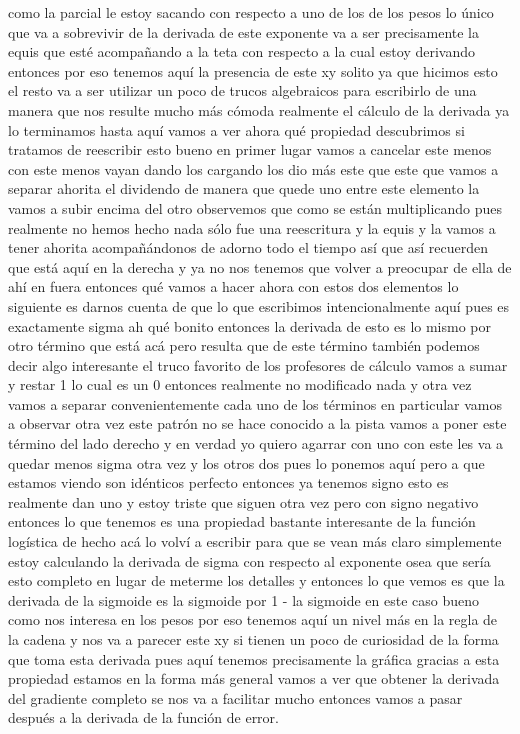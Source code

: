 como la parcial le estoy sacando con respecto a uno de los de los pesos lo único que va a sobrevivir de la derivada de este exponente va a ser precisamente la equis que esté acompañando a la teta con respecto a la cual estoy derivando entonces por eso tenemos aquí la presencia de este xy solito ya que hicimos esto el resto va a ser utilizar un poco de trucos algebraicos para escribirlo de una manera que nos resulte mucho más cómoda realmente el cálculo de la derivada ya lo terminamos hasta aquí vamos a ver ahora qué propiedad descubrimos si tratamos de reescribir esto bueno en primer lugar vamos a cancelar este menos con este menos vayan dando los cargando los dio más este que este que vamos a separar ahorita el dividendo de manera que quede uno entre este elemento la vamos a subir encima del otro observemos que como se están multiplicando pues realmente no hemos hecho nada sólo fue una reescritura y la equis y la vamos a tener ahorita acompañándonos de adorno todo el tiempo así que así recuerden que está aquí en la derecha y ya no nos tenemos que volver a preocupar de ella de ahí en fuera entonces qué vamos a hacer ahora con estos dos elementos lo siguiente es darnos cuenta de que lo que escribimos intencionalmente aquí pues es exactamente sigma ah qué bonito entonces la derivada de esto es lo mismo por otro término que está acá pero resulta que de este término también podemos decir algo interesante el truco favorito de los profesores de cálculo vamos a sumar y restar 1 lo cual es un 0 entonces realmente no modificado nada y otra vez vamos a separar convenientemente cada uno de los términos en particular vamos a observar otra vez este patrón no se hace conocido a la pista vamos a poner este término del lado derecho y en verdad yo quiero agarrar con uno con este les va a quedar menos sigma otra vez y los otros dos pues lo ponemos aquí pero a que estamos viendo son idénticos perfecto entonces ya tenemos signo esto es realmente dan uno y estoy triste que siguen otra vez pero con signo negativo entonces lo que tenemos es una propiedad bastante interesante de la función logística de hecho acá lo volví a escribir para que se vean más claro simplemente estoy calculando la derivada de sigma con respecto al exponente osea que sería esto completo en lugar de meterme los detalles y entonces lo que vemos es que la derivada de la sigmoide es la sigmoide por 1 - la sigmoide en este caso bueno como nos interesa en los pesos por eso tenemos aquí un nivel más en la regla de la cadena y nos va a parecer este xy si tienen un poco de curiosidad de la forma que toma esta derivada pues aquí tenemos precisamente la gráfica gracias a esta propiedad estamos en la forma más general vamos a ver que obtener la derivada del gradiente completo se nos va a facilitar mucho entonces vamos a pasar después a la derivada de la función de error.


